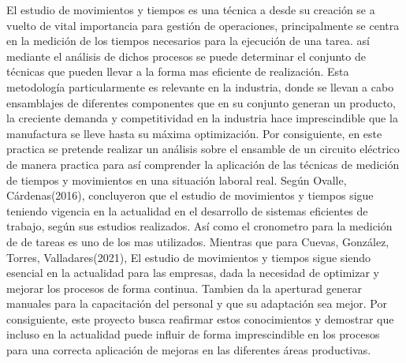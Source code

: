     \begin{itemize}
    El estudio de movimientos y tiempos es una técnica a desde su creación se a vuelto de vital importancia para gestión de operaciones, principalmente se centra en la medición de los tiempos necesarios para la ejecución de una tarea. así mediante el análisis de dichos procesos se puede determinar el conjunto de técnicas que pueden llevar a la forma mas eficiente de realización.
    Esta metodología particularmente es relevante en la industria, donde se llevan a cabo ensamblajes de diferentes componentes que en su conjunto generan un producto, la creciente demanda y competitividad en la industria hace imprescindible que la manufactura se lleve hasta su máxima optimización.
    Por consiguiente, en este practica se pretende realizar un análisis sobre el ensamble de un circuito eléctrico de manera practica para así comprender la aplicación de las técnicas de medición de tiempos y movimientos en una situación laboral real.
    Según Ovalle, Cárdenas(2016), concluyeron que el estudio de movimientos y tiempos sigue teniendo vigencia en la actualidad en el desarrollo de sistemas eficientes de trabajo, según sus estudios realizados. Así como el cronometro para la medición de de tareas es uno de los mas utilizados.
    Mientras que para Cuevas, González, Torres, Valladares(2021), El estudio de movimientos y tiempos sigue siendo esencial en la actualidad para las empresas, dada la necesidad de optimizar y mejorar los procesos de forma continua. Tambien da la aperturad generar manuales para la capacitación del personal y que su adaptación sea mejor.
    Por consiguiente, este proyecto busca reafirmar estos conocimientos y demostrar que incluso en la actualidad puede influir de forma imprescindible en los procesos para una correcta aplicación de mejoras en las diferentes áreas productivas. 
    
    \end{itemize}

